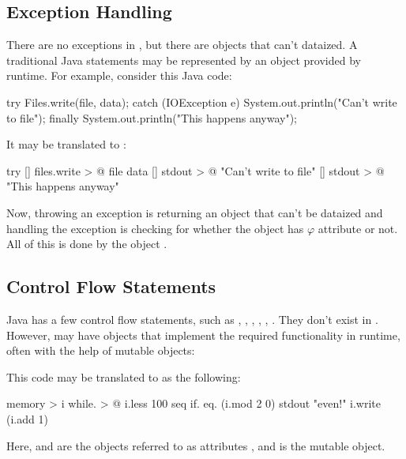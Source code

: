 \subsection{Exception Handling}

There are no exceptions in \eo{}, but there are objects that
can't dataized. A traditional Java  statements
may be represented by an object  provided by \eo{} runtime.
For example, consider this Java code:

\begin{ffcode}
try {
  Files.write(file, data);
} catch (IOException e) {
  System.out.println("Can't write to file");
} finally {
  System.out.println("This happens anyway");
}
\end{ffcode}

It may be translated to \eo{}:

\begin{ffcode}
try
  []
    files.write > @
      file
      data
  []
    stdout > @
      "Can't write to file"
  []
    stdout > @
      "This happens anyway"
\end{ffcode}

Now, throwing an exception is returning an object that can't be
dataized and handling the exception is checking for whether the
object has $\varphi$ attribute or not. All of this is done
by the object .

\subsection{Control Flow Statements}

Java has a few control flow statements, such as
, , , , , .
They don't exist in \eo{}. However, \eo{} may have objects
that implement the required functionality in runtime, often with the
help of mutable objects:


This code may be translated to \eo{} as the following:

\begin{ffcode}
[]
  memory > i
  while. > @
    i.less 100
    seq
      if.
        eq. (i.mod 2 0)
        stdout "even!"
      i.write (i.add 1)
\end{ffcode}

Here,  and  are the objects referred to as attributes
, and  is the mutable object.
